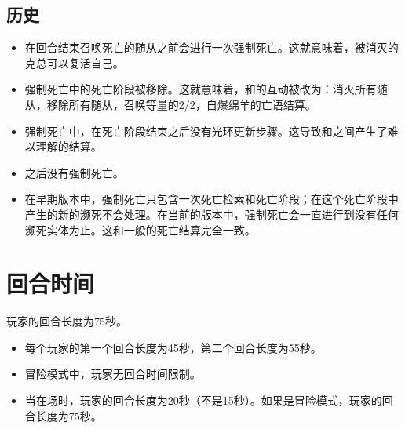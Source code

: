 \subsection{历史}

\begin{itemize}
    \item {} 在回合结束召唤死亡的随从之前会进行一次强制死亡。这就意味着，被消灭的克总可以复活自己。
    \item {} 强制死亡中的死亡阶段被移除。这就意味着，和的互动被改为：消灭所有随从，移除所有随从，召唤等量的2/2，自爆绵羊的亡语结算。
    \item {} 强制死亡中，在死亡阶段结束之后没有光环更新步骤。这导致和之间产生了难以理解的结算。
    \item {} 之后没有强制死亡。
    \item {} 在早期版本中，强制死亡只包含一次死亡检索和死亡阶段；在这个死亡阶段中产生的新的濒死不会处理。在当前的版本中，强制死亡会一直进行到没有任何濒死实体为止。这和一般的死亡结算完全一致。
\end{itemize}

\section{回合时间}

玩家的回合长度为75秒。
\begin{itemize}
    \item 每个玩家的第一个回合长度为45秒，第二个回合长度为55秒。
    \item 冒险模式中，玩家无回合时间限制。
    \item 当在场时，玩家的回合长度为20秒（不是15秒）。如果是冒险模式，玩家的回合长度为75秒。
\end{itemize}